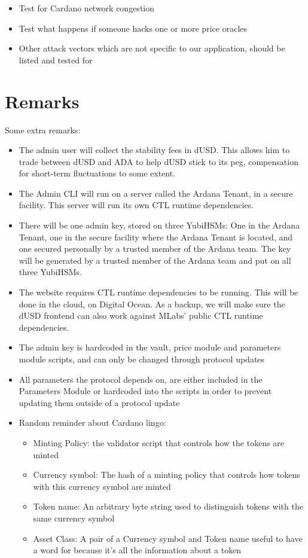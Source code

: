 \documentclass{article} %
\begin{document}
\begin{itemize}
  \item Test for Cardano network congestion
  \item Test what happens if someone hacks one or more price oracles
  \item Other attack vectors which are not specific to our application, should
    be listed and tested for
\end{itemize}

\section{Remarks}

Some extra remarks:
\begin{itemize}
  \item The admin user will collect the stability fees in dUSD. This allows him
    to trade between dUSD and ADA to help dUSD stick to its peg, compensation
    for short-term fluctuations to some extent.
  \item The Admin CLI will run on a server called the Ardana Tenant, in a secure
    facility. This server will run its own CTL runtime dependencies.
  \item There will be one admin key, stored on three YubiHSMs: One in the Ardana
    Tenant, one in the secure facility where the Ardana Tenant is located, and
    one secured personally by a trusted member of the Ardana team. The key will
    be generated by a trusted member of the Ardana team and put on all three
    YubiHSMs.
  \item The website requires CTL runtime dependencies to be running. This will
    be done in the cloud, on Digital Ocean. As a backup, we will make sure the
    dUSD frontend can also work against MLabs' public CTL runtime dependencies.
  \item The admin key is hardcoded in the vault, price module and parameters
    module scripts, and can only be changed through protocol updates
  \item All parameters the protocol depends on, are either included in the
    Parameters Module or hardcoded into the scripts in order to prevent updating
    them outside of a protocol update
  \item Random reminder about Cardano lingo:
    \begin{itemize}
      \item Minting Policy: the validator script that controls how the tokens
        are minted
      \item Currency symbol: The hash of a minting policy that controls how
        tokens with this currency symbol are minted
      \item Token name: An arbitrary byte string used to distinguish tokens with
        the same currency symbol
      \item Asset Class: A pair of a Currency symbol and Token name useful to
    have a word for because it's all the information about a token
    \end{itemize}
\end{itemize}
\end{document}
